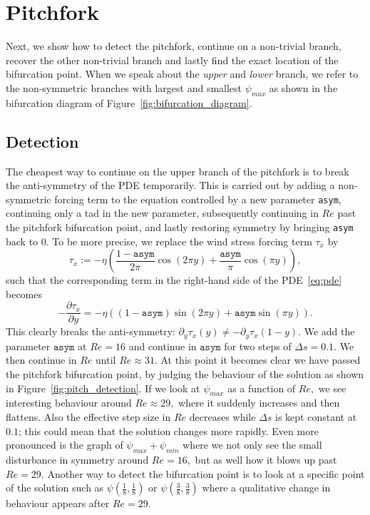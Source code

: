 \section{Pitchfork}

Next, we show how to detect the pitchfork, continue on a non-trivial branch, recover the other non-trivial branch and lastly find the exact location of the bifurcation point. When we speak about the {\em upper} and {\em lower} branch, we refer to the non-symmetric branches with largest and smallest $\psi_{max}$ as shown in the bifurcation diagram of Figure~\ref{fig:bifurcation_diagram}.

\subsection{Detection}
The cheapest way to continue on the upper branch of the pitchfork is to break the anti-symmetry of the PDE temporarily. This is carried out by adding a non-symmetric forcing term to the equation controlled by a new parameter {\tt asym}, continuing only a tad in the new parameter, subsequently continuing in $Re$ past the pitchfork bifurcation point, and lastly restoring symmetry by bringing {\tt asym} back to 0. To be more precise, we replace the wind stress forcing term $\tau_x$ by
\begin{equation}
    \tau_x := -\eta \left( \frac{1 - \mathtt{asym}}{2 \pi} \cos(2\pi y) + \frac{\mathtt{asym}}{\pi} \cos(\pi y) \right),
\end{equation}
such that the corresponding term in the right-hand side of the PDE~\eqref{eq:pde} becomes
\begin{equation}
    -\frac{\partial \tau_x}{\partial y} = -\eta ((1 - \mathtt{asym})\sin(2\pi y) + \mathtt{asym}\sin(\pi y)).
\end{equation}
This clearly breaks the anti-symmetry: $\partial_y \tau_x(y) \neq -\partial_y \tau_x(1 - y).$ We add the parameter $\mathtt{asym}$ at $Re = 16$ and continue in $\mathtt{asym}$ for two steps of $\Delta s = 0.1.$ We then continue in $Re$ until $Re \approx 31.$ At this point it becomes clear we have passed the pitchfork bifurcation point, by judging the behaviour of the solution as shown in Figure~\ref{fig:pitch_detection}. If we look at $\psi_{max}$ as a function of $Re,$ we see interesting behaviour around $Re \approx 29,$ where it suddenly increases and then flattens. Also the effective step size in $Re$ decreases while $\Delta s$ is kept constant at $0.1$; this could mean that the solution changes more rapidly. Even more pronounced is the graph of $\psi_{max} + \psi_{min}$ where we not only see the small disturbance in symmetry around $Re = 16,$ but as well how it blows up past $Re = 29.$ Another way to detect the bifurcation point is to look at a specific point of the solution such as $\psi(\tfrac{1}{8}, \tfrac{1}{8})$ or $\psi(\tfrac{3}{8}, \tfrac{3}{8})$ where a qualitative change in behaviour appears after $Re = 29.$

